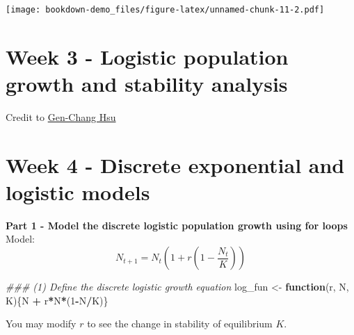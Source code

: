 \documentclass[
]{book}
\newenvironment{Shaded}{\begin{snugshade}}{\end{snugshade}}
\newcommand{\CommentTok}[1]{\textcolor[rgb]{0.56,0.35,0.01}{\textit{#1}}}
\newcommand{\ControlFlowTok}[1]{\textcolor[rgb]{0.13,0.29,0.53}{\textbf{#1}}}
\newcommand{\DataTypeTok}[1]{\textcolor[rgb]{0.13,0.29,0.53}{#1}}
\newcommand{\DecValTok}[1]{\textcolor[rgb]{0.00,0.00,0.81}{#1}}
\newcommand{\FloatTok}[1]{\textcolor[rgb]{0.00,0.00,0.81}{#1}}
\newcommand{\KeywordTok}[1]{\textcolor[rgb]{0.13,0.29,0.53}{\textbf{#1}}}
\newcommand{\NormalTok}[1]{#1}
\newcommand{\OperatorTok}[1]{\textcolor[rgb]{0.81,0.36,0.00}{\textbf{#1}}}
\newcommand{\StringTok}[1]{\textcolor[rgb]{0.31,0.60,0.02}{#1}}
\begin{document}
\texttt{[image: bookdown-demo\_files/figure-latex/unnamed-chunk-11-2.pdf]}

\hypertarget{week-3---logistic-population-growth-and-stability-analysis}{%
\chapter*{Week 3 - Logistic population growth and stability analysis}\label{week-3---logistic-population-growth-and-stability-analysis}}

Credit to \href{https://genchanghsu.github.io/index.html}{Gen-Chang Hsu}

\hypertarget{week-4---discrete-exponential-and-logistic-models}{%
\chapter*{Week 4 - Discrete exponential and logistic models}\label{week-4---discrete-exponential-and-logistic-models}}

\textbf{Part 1 - Model the discrete logistic population growth using for loops}
Model:
\[
N_{t+1} = N_t(1+r(1-\frac{N_t}{K}))
\]

\begin{Shaded}
\begin{Highlighting}[]
\CommentTok{### (1) Define the discrete logistic growth equation}
\NormalTok{log_fun <-}\StringTok{ }\ControlFlowTok{function}\NormalTok{(r, N, K)\{N }\OperatorTok{+}\StringTok{ }\NormalTok{r}\OperatorTok{*}\NormalTok{N}\OperatorTok{*}\NormalTok{(}\DecValTok{1}\OperatorTok{-}\NormalTok{N}\OperatorTok{/}\NormalTok{K)\}}
\end{Highlighting}
\end{Shaded}

You may modify \(r\) to see the change in stability of equilibrium \(K\).

\begin{Shaded}
\end{Shaded}
\end{document}
